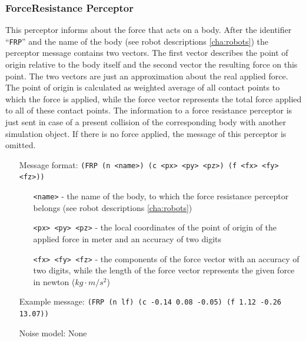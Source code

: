 \subsubsection{ForceResistance Perceptor}
\label{sec:FRP}
This perceptor informs about the force that acts on a body. After the identifier
``\texttt{FRP}'' and the name of the body (see robot descriptions
\ref{cha:robots}) the perceptor message contains two vectors. The first vector
describes the point of origin relative to the body itself and the second vector
the resulting force on this point. The two vectors are just an approximation
about the real applied force. The point of origin is calculated as weighted
average of all contact points to which the force is applied, while the force
vector represents the total force applied to all of these contact points. The
information to a force resistance perceptor is just sent in case of a present
collision of the corresponding body with another simulation object. If there is
no force applied, the message of this perceptor is omitted.



\begin{itemize}
	\item[Message format:] \texttt{(FRP (n <name>) (c <px> <py> <pz>) (f <fx> <fy>
	<fz>))}
		\begin{itemize}
		  \item[\texttt{<name>} -] the name of the body, to which the force resistance
		  perceptor belongs (see robot descriptions \ref{cha:robots})
		  \item[\texttt{<px> <py> <pz>} -] the local coordinates of the point of
		  origin of the applied force in meter and an accuracy of two digits
		  \item[\texttt{<fx> <fy> <fz>} -] the components of the force vector
		  with an accuracy of two digits, while the length of the force
		  vector represents the given force in newton ($kg \cdot m/s^{2}$)
		\end{itemize}
	\item[Example message:] \texttt{(FRP (n lf) (c -0.14 0.08 -0.05) (f 1.12 -0.26
	13.07))}
	\item[Noise model:] None
\end{itemize}



